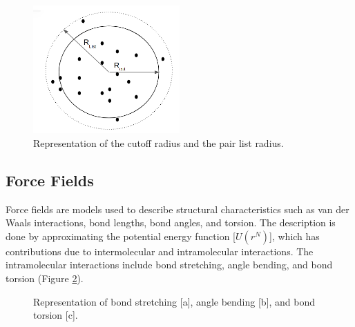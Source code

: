 \begin{figure}
	\centering
	\includegraphics[width=0.5\textwidth]{Figures/pairlist}
	\caption{Representation of the cutoff radius and the pair list radius.}
	\label{fig:pairlist}
\end{figure}
\FloatBarrier
\subsection{Force Fields }
Force fields are models used to describe structural characteristics such as van der Waals interactions, bond lengths, bond angles, and torsion. The description is done by approximating the potential energy function [$U(r^N)$], which has contributions due to intermolecular and intramolecular interactions. The intramolecular interactions include bond stretching, angle bending, and bond torsion (Figure \ref{fig:intraint}). 

\begin{figure}[H]
	\caption{Representation of bond stretching [a], angle bending [b], and bond torsion [c].}%
	\label{fig:intraint}%
\end{figure}


